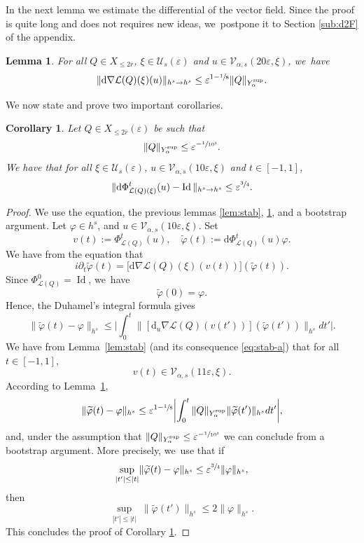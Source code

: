 \documentclass[JEP,XML,SOM,Unicode,published]{cedram}
\theoremstyle{plain}
\newtheorem{corollary}[theorem]{Corollary}
\newtheorem{lemma}[theorem]{Lemma}
\theoremstyle{definition}
\DeclareMathOperator{\Id}{Id}
\newcommand{\1}{\mathbf{1}}
\newcommand{\Ysup}[1]{Y_{#1}^{\mathrm{sup}}}
\let\epsilon\varepsilon
\begin{document}
In the next lemma we estimate the differential of the vector field. Since the proof is quite long and does not requires new ideas, we~postpone it to Section \ref{sub:d2F} of the appendix.
\begin{lemma}
\label{lem:d2F} For all $Q\in X_{\leq2\overline{r}}$, $\xi\in\mathcal{U}_{s}(\epsilon)$ and $u\in\mathcal{V}_{\alpha,s}(20\epsilon,\xi)$, we~have
\[
\| \mathrm{d}\nabla\mathcal{L}(Q)(\xi)(u)\|_{h^s\to h^s}
\leq
\epsilon^{1-\sfrac{1}{8}}
\|Q\|_{\Ysup{\alpha}}.
\]
\end{lemma}

We now state and prove two important corollaries.

\begin{corollary}\label{cor:dphi} Let $Q\in X_{\leq2\overline{r}}(\epsilon)$ be such that
\[
\|Q\|_{\Ysup{\alpha}}\leq \epsilon^{-\sfrac{1}{10^{3}}}.
\]
We have that for all $\xi\in\mathcal{U}_{s}(\epsilon)$, $u\in\mathcal{V}_{\alpha,s}(10\epsilon,\xi)$ and $t\in[-1,1]$,
\[
\|\mathrm{d}\Phi_{\mathcal{L}(Q)(\xi)}^t(u) - \Id \|_{h^{s}\to h^{s}} \leq \epsilon^{\sfrac{3}{4}}.
\]
\end{corollary}
\begin{proof}
We use the equation, the previous lemmas \ref{lem:stab}, \ref{lem:d2F}, and a bootstrap argument. Let $\varphi \in h^{s}$, and $u\in\mathcal{V}_{\alpha,s}(10\epsilon,\xi)$. Set
\[
v(t) := \Phi^t_{\mathcal{L}(Q)}(u),\quad \widetilde{\varphi}(t) := \mathrm{d}\Phi^{t}_{\mathcal{L}(Q)}(u)\varphi.
\]
We have from the equation that
\[
i\partial_{t}\widetilde{\varphi}(t) =
\big[
\mathrm{d}\nabla\mathcal{L}(Q)(\xi)(v(t))
\big]
(\widetilde{\varphi}(t)).
\]
Since $\Phi^{0}_{\mathcal{L}(Q)}=\operatorname{Id}$, we~have
\[
\widetilde{\varphi}(0)= \varphi.
\]
Hence, the Duhamel's integral formula gives
\[
\|\widetilde{\varphi}(t) - \varphi\|_{h^{s}}
\leq
\biggl|
\int_0^t
\bigl\|
[\mathrm{d}_{u}\nabla\mathcal{L}(Q)(v(t'))
]
(\widetilde{\varphi}(t'))
\bigr\|_{h^{s}}dt'
\biggr|.
\]
We have from Lemma~\ref{lem:stab} (and its consequence \eqref{eq:stab-a}) that for all $t\in[-1,1]$,
\[
v(t)\in\mathcal{V}_{\alpha,s}(11\epsilon,\xi).
\]
According to Lemma~\ref{lem:d2F},
\[
\|\widetilde{\varphi}(t)-\varphi\|_{h^{s}}
\leq \epsilon^{1-\sfrac{1}{8}}\biggl|\int_0^t
\|Q\|_{\Ysup{\alpha}}
\|\widetilde{\varphi}(t')
\|_{h^{s}}dt'\biggr|,
\]
and, under the assumption that $\|Q\|_{\Ysup{\alpha}}\leq \epsilon^{-\sfrac{1}{10^{3}}}$ we can conclude from a bootstrap argument. More precisely, we~use that if
\[
\underset{|t'|\leq |t|}{\sup}\|\widetilde{\varphi}(t)-\varphi\|_{h^{s}}
\leq
\epsilon^{\sfrac{3}{4}}
\|\varphi\|_{h^{s}},
\]
then
\[
\underset{|t'|\leq |t|}{\sup}\
\|\widetilde{\varphi}(t')
\|_{h^{s}}
\leq
2\|\varphi\|_{h^{s}}.
\]
This concludes the proof of Corollary \ref{cor:dphi}.
\end{proof}
\end{document}
